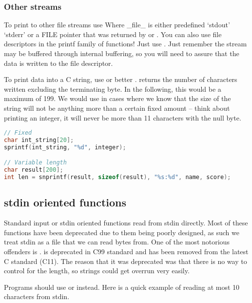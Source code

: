 \subsubsection{Other streams}

To print to other file streams use  Where \_file\_ is either predefined `stdout' `stderr' or a FILE pointer that was returned by  or .
You can also use file descriptors in the printf family of functions!
Just use .
Just remember the stream may be buffered through internal buffering, so you will need to assure that the data is written to the file descriptor.

To print data into a C string, use  or better .
 returns the number of characters written excluding the terminating byte.
In the following, this would be a maximum of 199.
We would use  in cases where we know that the size of the string will not be anything more than a certain fixed amount -- think about printing an integer, it will never be more than 11 characters with the null byte.

\begin{lstlisting}[language=C]
// Fixed
char int_string[20];
sprintf(int_string, "%d", integer);

// Variable length
char result[200];
int len = snprintf(result, sizeof(result), "%s:%d", name, score);
\end{lstlisting}

\subsection{stdin oriented functions}

Standard input or stdin oriented functions read from stdin directly.
Most of these functions have been deprecated due to them being poorly designed, as such we treat stdin as a file that we can read bytes from.
One of the most notorious offenders is .
 is deprecated in C99 standard and has been removed from the latest C standard (C11).
The reason that it was deprecated was that there is no way to control for the length, so strings could get overrun very easily.

Programs should use  or  instead.
Here is a quick example of reading at most 10 characters from stdin.

